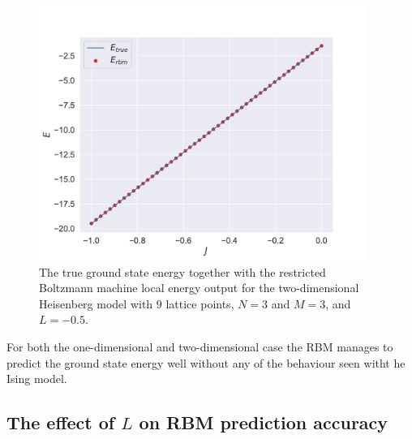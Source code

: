\begin{figure}[H]
  \begin{center}
    \includegraphics[width=0.95\textwidth]{Figures/Plots/Heisen/val-true[J][-1.0-0.0][e=500][n=9][N=3][M=3][L=-0.5]}
  \end{center}
  \caption{The true ground state energy together with the restricted Boltzmann machine local energy output for the two-dimensional Heisenberg model with $9$ lattice points, $N=3$ and $M=3$, and $L=-0.5$.}
\end{figure}

For both the one-dimensional and two-dimensional case the RBM manages to predict the ground state energy well without any of the behaviour seen witht he Ising model.

\subsection{The effect of \texorpdfstring{$L$}{L} on RBM prediction accuracy}

